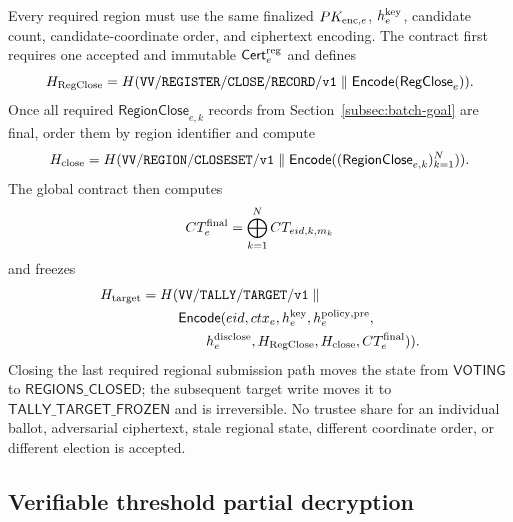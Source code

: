\documentclass[pdflatex,sn-mathphys-num]{sn-jnl}%
\theoremstyle{thmstyleone}%
\theoremstyle{thmstyletwo}%
\theoremstyle{thmstylethree}%
\begin{document}
Every required region must use the same finalized $PK_{{\rm enc},e}$,
$h_e^{\rm key}$, candidate count, candidate-coordinate order, and ciphertext
encoding.  The contract first requires one accepted and immutable
$\mathsf{Cert}_e^{\rm reg}$ and defines
\[
 H_{\rm RegClose}=H(\mathtt{VV/REGISTER/CLOSE/RECORD/v1}\parallel
                    \mathsf{Encode}(\mathsf{RegClose}_e)).
\]
Once all required $\mathsf{RegionClose}_{e,k}$ records from
Section~\ref{subsec:batch-goal} are final, order them by region identifier and
compute
\[
 H_{\rm close}=H(\mathtt{VV/REGION/CLOSESET/v1}\parallel
  \mathsf{Encode}((\mathsf{RegionClose}_{e,k})_{k=1}^{N})).
\]
The global contract then computes
\[
 CT_e^{\rm final}=\bigoplus_{k=1}^{N}CT_{eid,k,m_k}
\]
and freezes
\[
\begin{aligned}
 H_{\rm target}=H(&\mathtt{VV/TALLY/TARGET/v1}\parallel\\
 &\mathsf{Encode}(eid,ctx_e,h_e^{\rm key},h_e^{\rm policy,pre},\\
 &\qquad h_e^{\rm disclose},H_{\rm RegClose},H_{\rm close},
                  CT_e^{\rm final})).
\end{aligned}
\]
Closing the last required regional submission path moves the state from
$\mathsf{VOTING}$ to $\mathsf{REGIONS\_CLOSED}$; the subsequent target write
moves it to $\mathsf{TALLY\_TARGET\_FROZEN}$ and is irreversible.  No trustee share for
an individual ballot, adversarial ciphertext, stale regional state, different
coordinate order, or different election is accepted.

\subsection{Verifiable threshold partial decryption}
\label{subsec:threshold-partdec}
\end{document}
